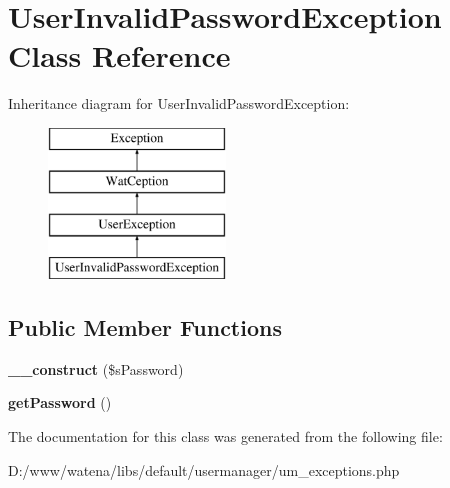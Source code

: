 \hypertarget{class_user_invalid_password_exception}{\section{User\-Invalid\-Password\-Exception Class Reference}
\label{class_user_invalid_password_exception}
}
Inheritance diagram for User\-Invalid\-Password\-Exception\-:\begin{figure}[H]
\begin{center}
\leavevmode
\includegraphics[height=4.000000cm]{class_user_invalid_password_exception}
\end{center}
\end{figure}
\subsection*{Public Member Functions}
\begin{DoxyCompactItemize}
\item 
\hypertarget{class_user_invalid_password_exception_a0cd739fcb02af206e475a8dd1cf48336}{{\bfseries \-\_\-\-\_\-construct} (\$s\-Password)}\label{class_user_invalid_password_exception_a0cd739fcb02af206e475a8dd1cf48336}

\item 
\hypertarget{class_user_invalid_password_exception_a56133f5361e1823445f677941251d75c}{{\bfseries get\-Password} ()}\label{class_user_invalid_password_exception_a56133f5361e1823445f677941251d75c}

\end{DoxyCompactItemize}


The documentation for this class was generated from the following file\-:\begin{DoxyCompactItemize}
\item 
D\-:/www/watena/libs/default/usermanager/um\-\_\-exceptions.\-php\end{DoxyCompactItemize}
